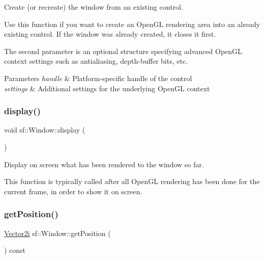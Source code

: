 Create (or recreate) the window from an existing control. 

Use this function if you want to create an Open\+GL rendering area into an already existing control. If the window was already created, it closes it first.

The second parameter is an optional structure specifying advanced Open\+GL context settings such as antialiasing, depth-\/buffer bits, etc.


\begin{DoxyParams}{Parameters}
{\em handle} & Platform-\/specific handle of the control \\
\hline
{\em settings} & Additional settings for the underlying Open\+GL context \\
\hline
\end{DoxyParams}
\mbox{\label{classsf_1_1_window_adabf839cb103ac96cfc82f781638772a}} 
\subsubsection{\texorpdfstring{display()}{display()}}
{\footnotesize\ttfamily void sf\+::\+Window\+::display (\begin{DoxyParamCaption}{ }\end{DoxyParamCaption})}



Display on screen what has been rendered to the window so far. 

This function is typically called after all Open\+GL rendering has been done for the current frame, in order to show it on screen. \mbox{\label{classsf_1_1_window_a420028b8e4d9baedcaaba7b2047b8cb3}} 
\subsubsection{\texorpdfstring{get\+Position()}{getPosition()}}
{\footnotesize\ttfamily \hyperlink{classsf_1_1_vector2}{Vector2i} sf\+::\+Window\+::get\+Position (\begin{DoxyParamCaption}{ }\end{DoxyParamCaption}) const}



